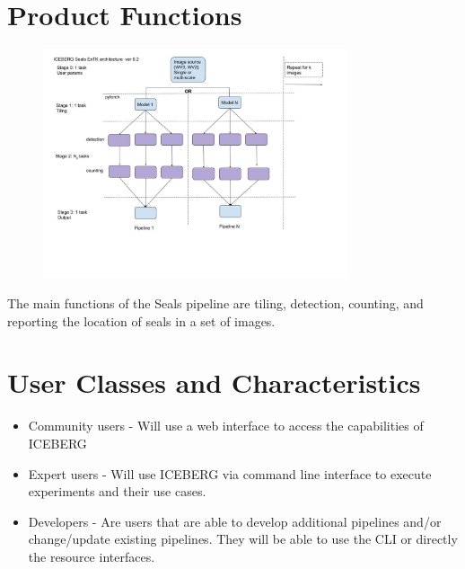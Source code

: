 \documentclass{scrreprt}
\begin{document}
\section{Product Functions}

\begin{figure}[H]
 \centering
 \includegraphics[width=0.8\textwidth]{SealsExecutionArchitecture.jpg}
\end{figure}

The main functions of the Seals pipeline are tiling, detection, counting, and reporting 
the location of seals in a set of images.

\section{User Classes and Characteristics}

\begin{itemize}
	\item Community users - Will use a web interface to access the capabilities
	of ICEBERG
	\item Expert users - Will use ICEBERG via command line interface to execute 
	experiments and their use cases.
	\item Developers - Are users that are able to develop additional pipelines 
	and/or change/update existing pipelines. They will be able to use the CLI or 
	directly the resource interfaces.
\end{itemize}
\end{document}
